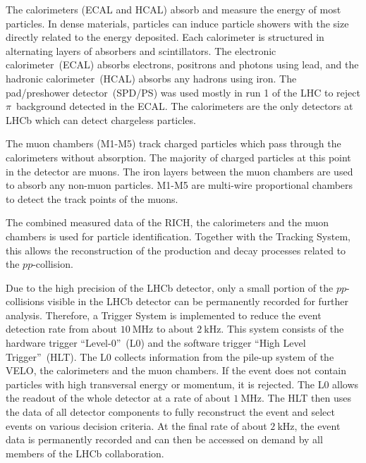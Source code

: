 The calorimeters (ECAL and HCAL) absorb and measure the energy of most particles.
In dense materials, particles can induce particle showers with the size directly related to the energy deposited.
Each calorimeter is structured in alternating layers of absorbers and scintillators. 
The electronic calorimeter~(ECAL) absorbs electrons, positrons and photons using lead, and the hadronic calorimeter~(HCAL) absorbs any hadrons using iron.
The pad/preshower detector~(SPD/PS) was used mostly in run 1 of the LHC to reject $\pi$~background detected in the ECAL. %
The calorimeters are the only detectors at LHCb which can detect chargeless particles.

The muon chambers (M1-M5) track charged particles which pass through the calorimeters without absorption.
The majority of charged particles at this point in the detector are muons.
The iron layers between the muon chambers are used to absorb any non-muon particles.
M1-M5 are multi-wire proportional chambers to detect the track points of the muons.

The combined measured data of the RICH, the calorimeters and the muon chambers is used for particle identification.
Together with the Tracking System, this allows the reconstruction of the production and decay processes related to the $pp$-collision.

Due to the high precision of the LHCb detector, only a small portion of the $pp$-collisions visible in the LHCb detector can be permanently recorded for further analysis.
Therefore, a Trigger System is implemented to reduce the event detection rate from about $\qty{10}{\MHz}$ to about $\qty{2}{\kHz}$.
This system consists of the hardware trigger \enquote{Level-0}~(L0) and the software trigger \enquote{High Level Trigger}~(HLT).
The L0 collects information from the pile-up system of the VELO, the calorimeters and the muon chambers.
If the event does not contain particles with high transversal energy or momentum, it is rejected.
The L0 allows the readout of the whole detector at a rate of about $\qty{1}{\MHz}$.
The HLT then uses the data of all detector components to fully reconstruct the event and select events on various decision criteria.
At the final rate of about $\qty{2}{\kHz}$, the event data is permanently recorded and can then be accessed on demand by all members of the LHCb collaboration.
